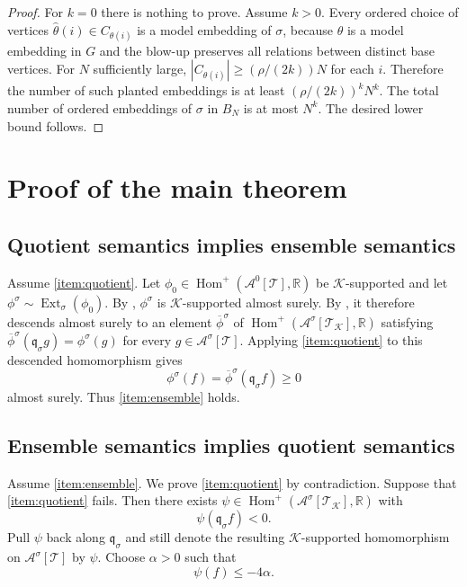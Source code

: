 \documentclass[11pt]{article}
\theoremstyle{definition}
\newcommand{\R}{\mathbb{R}}
\newcommand{\A}{\mathcal{A}}
\newcommand{\K}{\mathcal{K}}
\newcommand{\T}{\mathcal{T}}
\newcommand{\Homp}{\operatorname{Hom}^{+}}
\newcommand{\Ext}{\operatorname{Ext}}
\newcommand{\q}{\mathfrak q}
\begin{document}
\begin{proof}
For $k=0$ there is nothing to prove.  Assume $k>0$.  Every ordered choice of
vertices $\widehat\theta(i)\in C_{\theta(i)}$ is a model embedding of $\sigma$,
because $\theta$ is a model embedding in $G$ and the blow-up preserves all
relations between distinct base vertices.  For $N$ sufficiently large,
$|C_{\theta(i)}|\ge(\rho/(2k))N$ for each $i$.  Therefore the number of such
planted embeddings is at least $(\rho/(2k))^kN^k$.  The total number of ordered
embeddings of $\sigma$ in $B_N$ is at most $N^k$.  The desired lower bound
follows.
\end{proof}

\section{Proof of the main theorem}

\subsection{Quotient semantics implies ensemble semantics}

Assume \ref{item:quotient}.  Let $\phi_0\in\Homp(\A^0[\T],\R)$ be
$\K$-supported and let $\phi^\sigma\sim\Ext_\sigma(\phi_0)$.  By
, $\phi^\sigma$ is $\K$-supported almost surely.  By
, it therefore descends almost surely to an element
$\overline{\phi}^{\sigma}$ of $\Homp(\A^\sigma[\T_\K],\R)$ satisfying
$\overline{\phi}^{\sigma}(\q_\sigma g)=\phi^\sigma(g)$ for every
$g\in\A^\sigma[\T]$.  Applying \ref{item:quotient} to this descended
homomorphism gives
\[
  \phi^\sigma(f)=\overline{\phi}^{\sigma}(\q_\sigma f)\ge0
\]
almost surely.  Thus \ref{item:ensemble} holds.

\subsection{Ensemble semantics implies quotient semantics}

Assume \ref{item:ensemble}.  We prove \ref{item:quotient} by contradiction.
Suppose that \ref{item:quotient} fails.  Then there exists
$\psi\in\Homp(\A^\sigma[\T_\K],\R)$ with
\[
  \psi(\q_\sigma f)<0.
\]
Pull $\psi$ back along $\q_\sigma$ and still denote the resulting
$\K$-supported homomorphism on $\A^\sigma[\T]$ by $\psi$.  Choose $\alpha>0$ such
that
\begin{equation}\label{eq:negative-margin}
  \psi(f)\le -4\alpha.
\end{equation}
\end{document}
